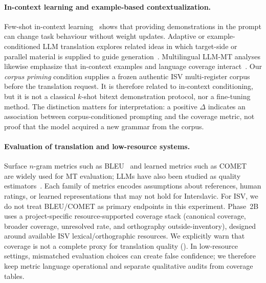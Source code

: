 \paragraph{In-context learning and example-based contextualization.}
Few-shot in-context learning~\citep{brown2020language} shows that providing demonstrations in the prompt can change task behaviour without weight updates.
Adaptive or example-conditioned LLM translation explores related ideas in which target-side or parallel material is supplied to guide generation~\citep{moslem2023adaptive}.
Multilingual LLM-MT analyses likewise emphasize that in-context examples and language coverage interact~\citep{zhu2023multilingual}.
Our \emph{corpus priming} condition supplies a frozen authentic ISV multi-register corpus before the translation request.
It is therefore related to in-context conditioning, but it is not a classical $k$-shot bitext demonstration protocol, nor a fine-tuning method.
The distinction matters for interpretation: a positive $\Delta$ indicates an association between corpus-conditioned prompting and the coverage metric, not proof that the model acquired a new grammar from the corpus.

\paragraph{Evaluation of translation and low-resource systems.}
Surface $n$-gram metrics such as BLEU~\citep{papineni-etal-2002-bleu} and learned metrics such as COMET~\citep{rei-etal-2020-comet} are widely used for MT evaluation; LLMs have also been studied as quality estimators~\citep{kocmi-federmann-2023-large}.
Each family of metrics encodes assumptions about references, human ratings, or learned representations that may not hold for Interslavic.
For ISV, we do not treat BLEU/COMET as primary endpoints in this experiment.
Phase~2B uses a project-specific resource-supported coverage stack (canonical coverage, broader coverage, unresolved rate, and orthography outside-inventory), designed around available ISV lexical/orthographic resources.
We explicitly warn that coverage is not a complete proxy for translation quality ().
In low-resource settings, mismatched evaluation choices can create false confidence; we therefore keep metric language operational and separate qualitative audits from coverage tables.

